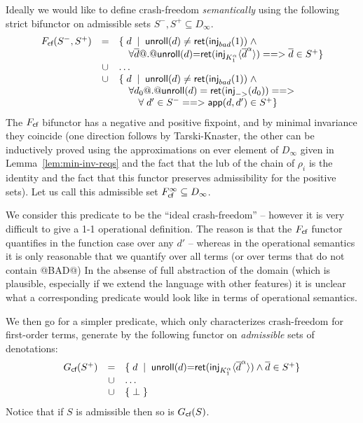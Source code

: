 \documentclass[preprint,nocopyrightspace]{sigplanconf}
\begin{document}
Ideally we would like to define crash-freedom {\em semantically} using the following 
strict bifunctor on admissible sets $S^{-},S^{+} \subseteq D_{\infty}$.
{\setlength{\arraycolsep}{2pt}
\[\begin{array}{rcl}
   F_{\textsf{cf}}(S^{-},S^{+}) & = & \{\;d\;\mid\;\mathsf{unroll}(d) \neq \mathsf{ret}(\mathsf{inj}_{bad}(1))\;\land\; \\ 
                      &    & \quad \forall \overline{d} @.@ \mathsf{unroll}(d){=}\mathsf{ret}(\mathsf{inj}_{K_1^\alpha}\langle\overline{d}^{\alpha}\rangle) ==> \overline{d} \in S^{+} \} \\ 
                   & \cup & \ldots \\ 
                   & \cup & \{\;d\;\mid\;\mathsf{unroll}(d) \neq \mathsf{ret}(\mathsf{inj}_{bad}(1))\;\land\; \\ 
                   &      & \quad \forall d_0 @.@ \mathsf{unroll}(d) = \mathsf{ret}(\mathsf{inj}_{->}(d_0)) ==> \\ 
                   &      & \quad\quad \forall\;d' \in S^{-} ==> \mathsf{app}(d,d') \in S^{+} \}  \\
\end{array}\]}
The $F_{\textsf{cf}}$ bifunctor has a negative and positive fixpoint, and by minimal invariance they coincide (one direction 
follows by Tarski-Knaster, the other can be inductively proved using the approximations on ever element of $D_{\infty}$ given
in Lemma~\ref{lem:min-inv-reqs} and the fact that the lub of the chain of $\rho_i$ is the identity and the fact that this 
functor preserves admissibility for the positive sets). Let us call this admissible set $F_{\textsf{cf}}^{\infty} \subseteq D_{\infty}$.

We consider this predicate to be the ``ideal crash-freedom'' -- however it is very difficult to give a 1-1 operational
definition. The reason is that the $F_{\textsf{cf}}$ functor quantifies in the function case over any $d'$ -- whereas in the operational
semantics it is only reasonable that we quantify over all terms (or over terms that do not contain @BAD@) In the absense of 
full abstraction of the domain (which is plausible, especially if we extend the language with other features) it is unclear 
what a corresponding predicate would look like in terms of operational semantics. 

We then go for a simpler predicate, which only characterizes crash-freedom for first-order terms, 
generate by the following functor on {\em admissible} sets of denotations:
{\setlength{\arraycolsep}{2pt}
\[\begin{array}{rcl}
   G_{\textsf{cf}}(S^{+}) & = & \{\;d\;\mid\; \mathsf{unroll}(d){=}\mathsf{ret}(\mathsf{inj}_{K_1^\alpha}\langle\overline{d}^{\alpha}\rangle) \land \overline{d} \in S^{+} \} \\ 
                  & \cup & \ldots \\ 
                  & \cup & \{\;\bot\;\}
\end{array}\]}
Notice that if $S$ is admissible then so is $G_{\textsf{cf}}(S)$. 
\end{document}
